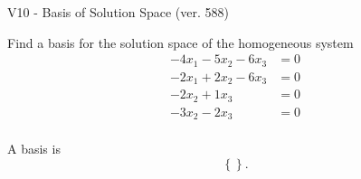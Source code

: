 \begin{exercise}
  \begin{exerciseTitle}V10 - Basis of Solution Space (ver. 588)\end{exerciseTitle}
  \begin{exerciseStatement}
    Find a basis for the solution space of the homogeneous system 
\begin{align*}
 -4 x_ 1 -5 x_ 2 -6 x_ 3 &= 0  \\ 
  -2 x_ 1 + 2 x_ 2 -6 x_ 3 &= 0  \\ 
  -2 x_ 2 + 1 x_ 3 &= 0  \\ 
  -3 x_ 2 -2 x_ 3 &= 0  \\ 
 \end{align*}


 
  \end{exerciseStatement}

  \begin{exerciseAnswer}
   A basis is   
\[\left\{\right\}.\]

  


  \end{exerciseAnswer}
\end{exercise}